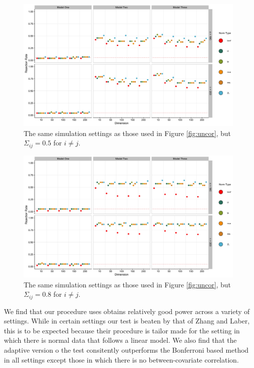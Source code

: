 \documentclass{article}
\begin{document}
\begin{figure}[]
	\centering
\includegraphics[width = \linewidth]{some_core.jpg}
	\caption{The same simulation settings as those used in Figure \ref{fig:uncor}, but $\Sigma_{ij} = 0.5$ for $i \neq j$.}
	\label{fig:somecor}
\end{figure}	

\begin{figure}[]
	\centering
\includegraphics[width = \linewidth]{lots_cor.jpg}
	\caption{The same simulation settings as those used in Figure \ref{fig:uncor}, but $\Sigma_{ij} = 0.8$ for $i \neq j$.}
	\label{fig:lotscor}
\end{figure}

We find that our procedure uses obtains relatively good power across a variety of settings.  While in certain settings our test is beaten by that of Zhang and Laber, this is to be expected because their procedure is tailor made for the setting in which there is normal data that follows a linear model. We also find that the adaptive version o the test consitently outperforms the Bonferroni based method in all settings except those in which there is no between-covariate correlation.
\end{document}
